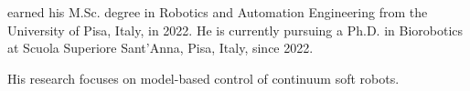 earned his M.Sc. degree in Robotics and Automation Engineering from the University of Pisa, Italy, in 2022. He is currently pursuing a Ph.D. in Biorobotics at Scuola Superiore Sant'Anna, Pisa, Italy, since 2022. 

His research focuses on model-based control of continuum soft robots.
